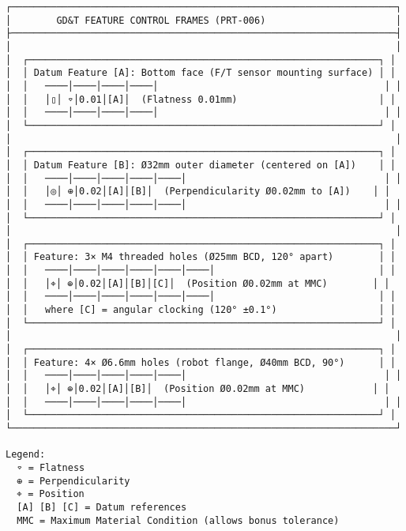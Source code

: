 \documentclass[
]{article}
\begin{document}
\begin{verbatim}
┌────────────────────────────────────────────────────────────────────┐
│        GD&T FEATURE CONTROL FRAMES (PRT-006)                       │
├────────────────────────────────────────────────────────────────────┤
│                                                                    │
│  ┌──────────────────────────────────────────────────────────────┐ │
│  │ Datum Feature [A]: Bottom face (F/T sensor mounting surface) │ │
│  │   ────│────│────│────│                                        │ │
│  │   │▯│ ⌔│0.01│[A]│  (Flatness 0.01mm)                         │ │
│  │   ────│────│────│────│                                        │ │
│  └──────────────────────────────────────────────────────────────┘ │
│                                                                    │
│  ┌──────────────────────────────────────────────────────────────┐ │
│  │ Datum Feature [B]: Ø32mm outer diameter (centered on [A])    │ │
│  │   ────│────│────│────│────│                                   │ │
│  │   │◎│ ⊕│0.02│[A]│[B]│  (Perpendicularity Ø0.02mm to [A])    │ │
│  │   ────│────│────│────│────│                                   │ │
│  └──────────────────────────────────────────────────────────────┘ │
│                                                                    │
│  ┌──────────────────────────────────────────────────────────────┐ │
│  │ Feature: 3× M4 threaded holes (Ø25mm BCD, 120° apart)        │ │
│  │   ────│────│────│────│────│────│                             │ │
│  │   │⌖│ ⊕│0.02│[A]│[B]│[C]│  (Position Ø0.02mm at MMC)        │ │
│  │   ────│────│────│────│────│────│                             │ │
│  │   where [C] = angular clocking (120° ±0.1°)                  │ │
│  └──────────────────────────────────────────────────────────────┘ │
│                                                                    │
│  ┌──────────────────────────────────────────────────────────────┐ │
│  │ Feature: 4× Ø6.6mm holes (robot flange, Ø40mm BCD, 90°)      │ │
│  │   ────│────│────│────│────│                                   │ │
│  │   │⌖│ ⊕│0.02│[A]│[B]│  (Position Ø0.02mm at MMC)            │ │
│  │   ────│────│────│────│────│                                   │ │
│  └──────────────────────────────────────────────────────────────┘ │
└────────────────────────────────────────────────────────────────────┘

Legend:
  ⌔ = Flatness
  ⊕ = Perpendicularity
  ⌖ = Position
  [A] [B] [C] = Datum references
  MMC = Maximum Material Condition (allows bonus tolerance)
\end{verbatim}
\end{document}
